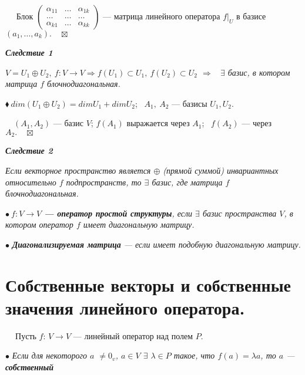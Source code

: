 \documentclass[a4paper, 12pt]{report}
\begin{document}
	\par\bigskip
	$\quad$ Блок $\begin{pmatrix} \alpha_{11} & \dots & \alpha_{1k}  \\ \dots & \dots & \dots \\ \alpha_{k1} & \dots & \alpha_{kk} \end{pmatrix}$ --- матрица линейного оператора $f|_U$ в базисе $(a_1, \dots, a_k). \quad \boxtimes$
	
	\par\bigskip
	\textit{\textbf{Следствие 1}}
	
	\textit{$V = U_1 \oplus U_2,\ f: V \rightarrow V \Rightarrow f(U_1) \subset U_1,\ f(U_2) \subset U_2 $ $\Rightarrow$ \ $\exists$ базис, в котором матрица $f$ блочнодиагональная.}
	\par\bigskip
	$\blacklozenge\ dim (U_1 \oplus U_2) = dim U_1 + dim U_2$; \ $ A_1, \ A_2$ --- базисы $U_1,  U_2$.
	
	$\quad (A_1, A_2)$ --- базис $V$; $f(A_1)$ выражается через $A_1$; \ $f(A_2)$   --- через $A_2. \quad \boxtimes$
	\par\bigskip
	
	\textit{\textbf{Следствие 2}}
	
	\textit {Если векторное пространство является $ \oplus$ (прямой суммой) инвариантных относительно $f$ подпространств, то $\exists$ базис, где матрица $f$ блочнодиагональная.}
	
	$\bullet \ f: V \rightarrow V$ \textit{\textbf {--- оператор простой структуры}, если $\exists$ базис пространства $V$, в котором оператор $f$ имеет диагональную матрицу.}
	
	$\bullet$ \textit{\textbf{Диагонализируемая матрица} --- если имеет подобную диагональную матрицу.}
	
	
	
	
	
	
	
	
	
	
	
	
	
	
	
	
	
	\section{Собственные векторы и собственные значения линейного оператора.}
	$\quad \ $Пусть $f$: $V \rightarrow V$ --- линейный оператор над полем $P$.
	\par\bigskip
	$\bullet$ \textit{Если для некоторого $a$ $\not= 0_v$, $a \in V$ $\exists$ $\lambda \in P$ такое, что $f(a) = \lambda a$,  то $a$ --- \textbf{собственный}}
	
\end{document}
